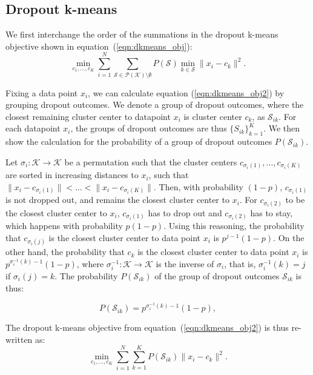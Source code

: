 \documentclass{article}
\begin{document}
\subsection{Dropout k-means}
We first interchange the order of the summations in the dropout k-means objective shown in equation~(\ref{eqn:dkmeans_obj}): 
\begin{equation}
    \min_{c_1,\dots,c_K} \sum_{i=1}^N \sum_{\mathcal{S}\in\mathcal{P}(\mathcal{K})\setminus\emptyset} P(\mathcal{S})  \min_{k\in \mathcal{S}} \|x_i-c_k\|^2.
    \label{eqn:dkmeans_obj2}
\end{equation}

Fixing a data point $x_i$, we can calculate equation (\ref{eqn:dkmeans_obj2}) by grouping dropout outcomes. We denote a group of dropout outcomes, where the closest remaining cluster center to datapoint $x_i$ is cluster center $c_k$, as $\mathcal{S}_{ik}$. For each datapoint $x_i$, the groups of dropout outcomes are thus $\{S_{ik}\}_{k=1}^{K}$. We then show the calculation for the probability of a group of dropout outcomes $P(\mathcal{S}_{ik})$.

Let $\sigma_i:\mathcal{K}\to\mathcal{K}$ be a permutation such that the cluster centers $c_{\sigma_i(1)},\dots,c_{\sigma_i(K)}$ are sorted in increasing distances to $x_i$, such that $\|x_i-c_{\sigma_i(1)}\|<\dots<\|x_i-c_{\sigma_i(K)}\|$. Then, with probability $(1-p)$, $c_{\sigma_i(1)}$ is not dropped out, and remains the closest cluster center to $x_i$. For $c_{\sigma_i(2)}$ to be the closest cluster center to $x_i$, $c_{\sigma_i(1)}$ has to drop out and $c_{\sigma_i(2)}$ has to stay, which happens with probability $p(1-p)$. Using this reasoning, the probability that $c_{\sigma_i(j)}$ is the closest cluster center to data point $x_i$ is $p^{j-1}(1-p)$. On the other hand, the probability that $c_k$ is the closest cluster center to data point $x_i$ is $p^{\sigma_i^{-1}(k)-1}(1-p)$, where $\sigma_i^{-1}:\mathcal{K}\to\mathcal{K}$ is the inverse of $\sigma_i$, that is, $\sigma_i^{-1}(k)=j$ if $\sigma_i(j)=k$. The probability $P(\mathcal{S}_{ik})$ of the group of dropout outcomes $\mathcal{S}_{ik}$ is thus:

\begin{equation}
    P(\mathcal{S}_{ik})=p^{\sigma_i^{-1}(k)-1}(1-p),
    \label{eqn:dkmeans_obj_b}
\end{equation}

The dropout k-means objective from equation~(\ref{eqn:dkmeans_obj2}) is thus re-written as: 
\begin{equation}
\min_{c_1,\dots,c_K} \sum_{i=1}^N \sum_{k=1}^K P(\mathcal{S}_{ik}) \|x_i-c_{k}\|^2.
    \label{eqn:dropout_kmeans_sorted}
\end{equation}
\end{document}
